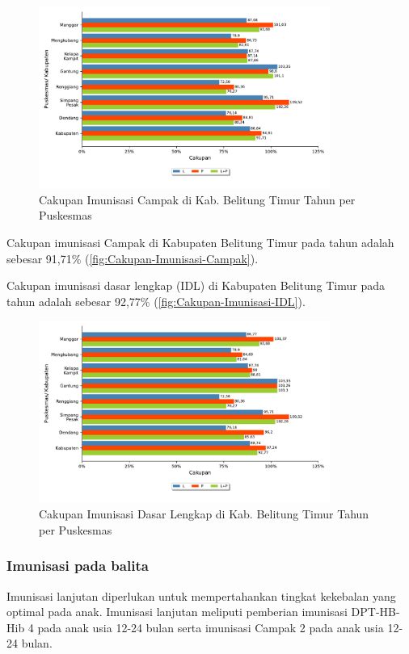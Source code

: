 \begin{figure}[H]
    \centering
    \includegraphics[width=0.85\textwidth]{bab_05/bab_05_20a_imunCampak}
    \caption{Cakupan Imunisasi Campak di Kab. Belitung Timur Tahun \tP per Puskesmas}
    \label{fig:Cakupan-Imunisasi-Campak}
\end{figure}

Cakupan imunisasi Campak di Kabupaten Belitung Timur pada tahun \tP adalah sebesar 91,71\% (\autoref{fig:Cakupan-Imunisasi-Campak}).

Cakupan imunisasi dasar lengkap (IDL) di Kabupaten Belitung Timur pada tahun \tP adalah sebesar 92,77\% (\autoref{fig:Cakupan-Imunisasi-IDL}).

\begin{figure}[H]
    \centering
    \includegraphics[width=0.85\textwidth]{bab_05/bab_05_20b_imunIDL}
    \caption{Cakupan Imunisasi Dasar Lengkap di Kab. Belitung Timur Tahun \tP per Puskesmas}
    \label{fig:Cakupan-Imunisasi-IDL}
\end{figure}

\subsubsection{Imunisasi pada balita}
Imunisasi lanjutan diperlukan untuk mempertahankan tingkat kekebalan yang optimal pada anak.
Imunisasi lanjutan meliputi pemberian imunisasi DPT-HB-Hib 4 pada anak usia 12-24 bulan serta imunisasi Campak 2 pada anak usia 12-24 bulan.

